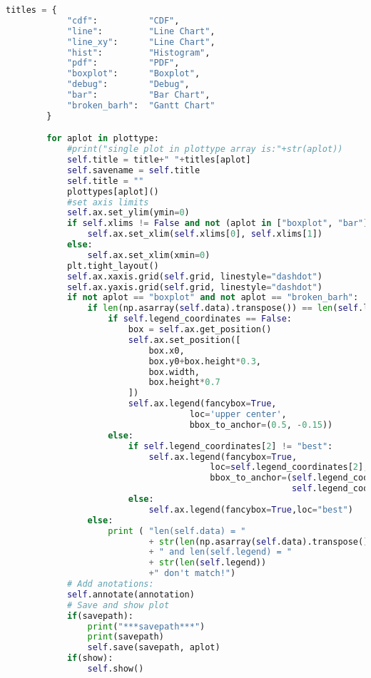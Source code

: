 \begin{lstlisting}[language=Python,caption=myplot.py]
        titles = {
            "cdf":          "CDF",
            "line":         "Line Chart",
            "line_xy":      "Line Chart",
            "hist":         "Histogram",
            "pdf":          "PDF",
            "boxplot":      "Boxplot",
            "debug":        "Debug",
            "bar":          "Bar Chart",
            "broken_barh":  "Gantt Chart"
        }

        for aplot in plottype:
            #print("single plot in plottype array is:"+str(aplot))
            self.title = title+" "+titles[aplot]
            self.savename = self.title
            self.title = ""
            plottypes[aplot]()
            #set axis limits
            self.ax.set_ylim(ymin=0)
            if self.xlims != False and not (aplot in ["boxplot", "bar"]):
                self.ax.set_xlim(self.xlims[0], self.xlims[1])
            else:
                self.ax.set_xlim(xmin=0)
            plt.tight_layout()
            self.ax.xaxis.grid(self.grid, linestyle="dashdot")
            self.ax.yaxis.grid(self.grid, linestyle="dashdot")
            if not aplot == "boxplot" and not aplot == "broken_barh":
                if len(np.asarray(self.data).transpose()) == len(self.legend):
                    if self.legend_coordinates == False:
                        box = self.ax.get_position()
                        self.ax.set_position([
                            box.x0,
                            box.y0+box.height*0.3,
                            box.width,
                            box.height*0.7
                        ])
                        self.ax.legend(fancybox=True,
                                    loc='upper center',
                                    bbox_to_anchor=(0.5, -0.15))
                    else:
                        if self.legend_coordinates[2] != "best":
                            self.ax.legend(fancybox=True,
                                        loc=self.legend_coordinates[2],
                                        bbox_to_anchor=(self.legend_coordinates[0],
                                                        self.legend_coordinates[1]))
                        else:
                            self.ax.legend(fancybox=True,loc="best")
                else:
                    print ( "len(self.data) = "
                            + str(len(np.asarray(self.data).transpose()))
                            + " and len(self.legend) = "
                            + str(len(self.legend))
                            +" don't match!")
            # Add anotations:
			self.annotate(annotation)
            # Save and show plot
            if(savepath):
                print("***savepath***")
                print(savepath)
                self.save(savepath, aplot)
            if(show):
                self.show()


\end{lstlisting}
